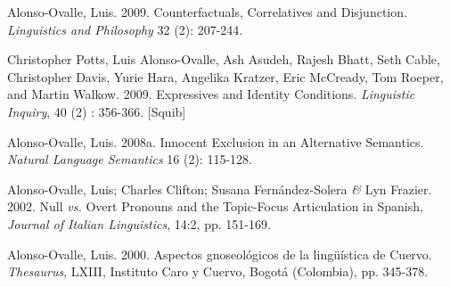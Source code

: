 \documentclass[11pt]{article}
\begin{document}
Alonso-Ovalle, Luis. 2009. Counterfactuals,
  Correlatives and Disjunction. \textit{Linguistics and Philosophy} 32 (2): 207-244.


Christopher Potts, Luis Alonso-Ovalle, Ash Asudeh,
    Rajesh Bhatt, Seth Cable, Christopher Davis, Yurie Hara, Angelika
    Kratzer, Eric McCready, Tom Roeper, and Martin Walkow. 2009. 
  Expressives and Identity Conditions. \textit{Linguistic Inquiry}, 40
  (2) : 356-366. [Squib]

Alonso-Ovalle, Luis. 2008a. Innocent Exclusion in an
  Alternative Semantics. \textit{Natural Language Semantics} 16 (2):
  115-128. 


Alonso-Ovalle, Luis; Charles Clifton; Susana Fern\'andez-Solera \textit{\&} Lyn Frazier. 2002. Null \textit{vs.} Overt Pronouns and the Topic-Focus Articulation in Spanish, \textit{Journal of Italian Linguistics}, 14:2, pp. 151-169. 

Alonso-Ovalle, Luis. 2000. Aspectos gnoseol\'ogicos de la ling\"u\'istica de Cuervo. \textit{Thesaurus}, LXIII, Instituto Caro y Cuervo, Bogot\'a (Colombia), pp. 345-378. 


\end{document}
